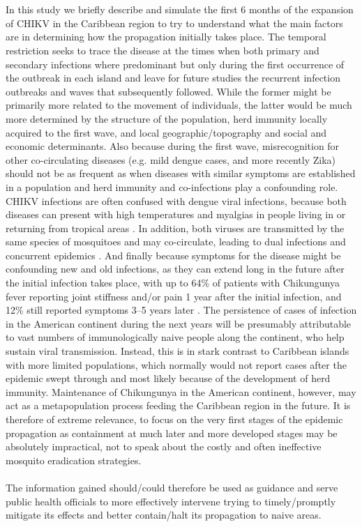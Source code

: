 \documentclass[10pt,a4paper]{article}
\begin{document}
\\\\
In this study we briefly describe and simulate the first 6 months of the expansion of CHIKV in the Caribbean region to try to understand what the main factors are in determining how the propagation initially takes place. The temporal restriction seeks to trace the disease at the times when both primary and secondary infections where predominant but only during the first occurrence of the outbreak in each island and leave for future studies the recurrent infection outbreaks and waves that subsequently followed. While the former might be primarily more related to the movement of individuals, the latter would be much more determined by the structure of the population, herd immunity locally acquired to the first wave, and local geographic/topography and social and economic determinants. Also because during the first wave, misrecognition for other co-circulating diseases (e.g. mild dengue cases, and more recently Zika) should not be as frequent as when diseases with similar symptoms are established in a population and herd immunity and co-infections play a confounding role. CHIKV infections are often confused with dengue viral infections, because both diseases can present with high temperatures and myalgias in people living in or returning from tropical areas \citep{queyriaux2008clinical}. In addition, both viruses are transmitted by the same species of mosquitoes and may co-circulate, leading to dual infections and concurrent epidemics \citep{nimmannitya1969dengue, myers1967concurrent, nimmannitya1969dengue}. And finally because symptoms for the disease might be confounding new and old infections, as they can extend long in the future after the initial infection takes place, with up to 64\% of patients with Chikungunya fever reporting joint stiffness and/or pain 1 year after the initial infection, and 12\% still reported symptoms 3–5 years later \citep{brighton1983chikungunya, borgherini2008persistent, sissoko2009post}. The persistence of cases of infection in the American continent during the next years will be presumably attributable to vast numbers of immunologically naive people along the continent, who help sustain viral transmission. Instead, this is in stark contrast to Caribbean islands with more limited populations, which normally would not report cases after the epidemic swept through and most likely because of the development of herd immunity. Maintenance of Chikungunya in the American continent, however, may act as a metapopulation process feeding the Caribbean region in the future. It is therefore of extreme relevance, to focus on the very first stages of the epidemic propagation as containment at much later and more developed stages may be absolutely impractical, not to speak about the costly and often ineffective mosquito eradication strategies.
\\\\
The information gained should/could therefore be used as guidance and serve public health officials to more effectively intervene trying to timely/promptly mitigate its effects and better contain/halt its propagation to naive areas.
\\\\
%
\end{document}
